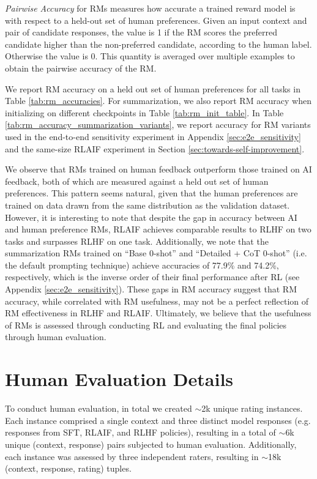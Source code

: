 \documentclass[11pt]{article}
\begin{document}
\textit{Pairwise Accuracy} for RMs measures how accurate a trained reward model is with respect to a held-out set of human preferences. Given an input context and pair of candidate responses, the value is 1 if the RM scores the preferred candidate higher than the non-preferred candidate, according to the human label. Otherwise the value is 0. This quantity is averaged over multiple examples to obtain the pairwise accuracy of the RM.

We report RM accuracy on a held out set of human preferences for all tasks in Table \ref{tab:rm_accuracies}. For summarization, we also report RM accuracy when initializing on different checkpoints in Table \ref{tab:rm_init_table}. In Table \ref{tab:rm_accuracy_summarization_variants}, we report accuracy for RM variants used in the end-to-end sensitivity experiment in Appendix \ref{sec:e2e_sensitivity} and the same-size RLAIF experiment in Section \ref{sec:towards-self-improvement}.

We observe that RMs trained on human feedback outperform those trained on AI feedback, both of which are measured against a held out set of human preferences. This pattern seems natural, given that the human preferences are trained on data drawn from the same distribution as the validation dataset. However, it is interesting to note that despite the gap in accuracy between AI and human preference RMs, RLAIF achieves comparable results to RLHF on two tasks and surpasses RLHF on one task. Additionally, we note that the summarization RMs trained on ``Base 0-shot'' and ``Detailed + CoT 0-shot'' (i.e. the default prompting technique) achieve accuracies of 77.9\% and 74.2\%, respectively, which is the inverse order of their final performance after RL (see Appendix \ref{sec:e2e_sensitivity}). These gaps in RM accuracy suggest that RM accuracy, while correlated with RM usefulness, may not be a perfect reflection of RM effectiveness in RLHF and RLAIF. Ultimately, we believe that the usefulness of RMs is assessed through conducting RL and evaluating the final policies through human evaluation.


\section{Human Evaluation Details}
\label{sec:human_eval_details}

To conduct human evaluation, in total we created $\sim$2k unique rating instances. Each instance comprised a single context and three distinct model responses (e.g. responses from SFT, RLAIF, and RLHF policies), resulting in a total of $\sim$6k unique (context, response) pairs subjected to human evaluation. Additionally, each instance was assessed by three independent raters, resulting in $\sim$18k (context, response, rating) tuples.
\end{document}
